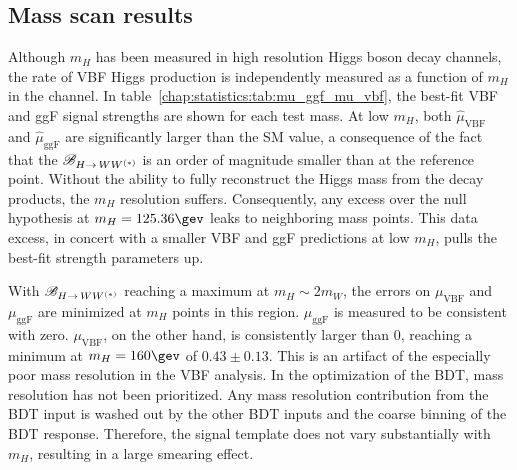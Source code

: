 \subsection{Mass scan results}

Although $m_H$ has been measured in high resolution Higgs boson decay
channels, the rate of VBF Higgs production is independently measured
as a function of $m_H$ in the \wwlnln channel. In
table~\ref{chap:statistics:tab:mu_ggf_mu_vbf}, the best-fit VBF and
ggF signal strengths are shown for each test mass. At low $m_H$, both
$\hat{\mu}_{\textrm{VBF}}$ and
$\hat{\mu}_{\textrm{ggF}}$ are
significantly larger than the SM value, a consequence of the fact that
the $\mathscr{B}_{H{\rightarrow\,}WW^{(\ast)}}$ is an order of magnitude smaller than at the
reference
point. Without the ability to fully reconstruct the Higgs mass
from the decay products, the $m_H$ resolution suffers. Consequently,
any
excess over the null hypothesis at $m_H = 125.36 \gev$ leaks to
neighboring mass
points. This data excess, in concert with a smaller VBF and ggF
predictions at low $m_H$, pulls the best-fit strength parameters
up.

With $\mathscr{B}_{H{\rightarrow\,}WW^{(\ast)}}$ reaching a maximum at $m_H \sim 2 m_W$, the
errors on
$\mu_{\textrm{VBF}}$ and $\mu_{\textrm{ggF}}$ are minimized at $m_H$
points in this region. $\mu_{\textrm{ggF}}$ is measured to be
consistent with zero. $\mu_{\textrm{VBF}}$, on the other hand, is
consistently larger than 0, reaching a minimum at $m_H = 160 \gev$ of
$0.43 \pm 0.13$. This is an artifact of the especially poor mass
resolution in the VBF analysis. In the optimization of the BDT, mass
resolution has not been prioritized. Any mass resolution contribution
from the BDT input \mT is washed out by the other BDT inputs and the
coarse binning of the BDT response. Therefore, the signal template
does not vary
substantially with $m_H$, resulting in a large smearing
effect.

